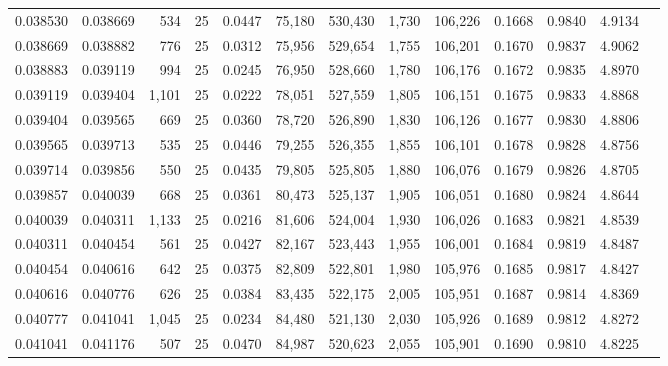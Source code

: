 \begin{tabular}{rrrrrrrrrrrrr}
0.038530 & 0.038669 &   534 &  25 &                                     0.0447 &  75,180 & 530,430 &   1,730 & 106,226 & 0.1668 & 0.9840 & 4.9134 \\
0.038669 & 0.038882 &   776 &  25 &                                     0.0312 &  75,956 & 529,654 &   1,755 & 106,201 & 0.1670 & 0.9837 & 4.9062 \\
0.038883 & 0.039119 &   994 &  25 &                                     0.0245 &  76,950 & 528,660 &   1,780 & 106,176 & 0.1672 & 0.9835 & 4.8970 \\
0.039119 & 0.039404 & 1,101 &  25 &                                     0.0222 &  78,051 & 527,559 &   1,805 & 106,151 & 0.1675 & 0.9833 & 4.8868 \\
0.039404 & 0.039565 &   669 &  25 &                                     0.0360 &  78,720 & 526,890 &   1,830 & 106,126 & 0.1677 & 0.9830 & 4.8806 \\
0.039565 & 0.039713 &   535 &  25 &                                     0.0446 &  79,255 & 526,355 &   1,855 & 106,101 & 0.1678 & 0.9828 & 4.8756 \\
0.039714 & 0.039856 &   550 &  25 &                                     0.0435 &  79,805 & 525,805 &   1,880 & 106,076 & 0.1679 & 0.9826 & 4.8705 \\
0.039857 & 0.040039 &   668 &  25 &                                     0.0361 &  80,473 & 525,137 &   1,905 & 106,051 & 0.1680 & 0.9824 & 4.8644 \\
0.040039 & 0.040311 & 1,133 &  25 &                                     0.0216 &  81,606 & 524,004 &   1,930 & 106,026 & 0.1683 & 0.9821 & 4.8539 \\
0.040311 & 0.040454 &   561 &  25 &                                     0.0427 &  82,167 & 523,443 &   1,955 & 106,001 & 0.1684 & 0.9819 & 4.8487 \\
0.040454 & 0.040616 &   642 &  25 &                                     0.0375 &  82,809 & 522,801 &   1,980 & 105,976 & 0.1685 & 0.9817 & 4.8427 \\
0.040616 & 0.040776 &   626 &  25 &                                     0.0384 &  83,435 & 522,175 &   2,005 & 105,951 & 0.1687 & 0.9814 & 4.8369 \\
0.040777 & 0.041041 & 1,045 &  25 &                                     0.0234 &  84,480 & 521,130 &   2,030 & 105,926 & 0.1689 & 0.9812 & 4.8272 \\
0.041041 & 0.041176 &   507 &  25 &                                     0.0470 &  84,987 & 520,623 &   2,055 & 105,901 & 0.1690 & 0.9810 & 4.8225 \\

\end{tabular}
